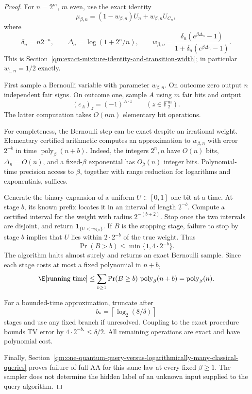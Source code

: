 \begin{proof}
For \(n=2^m\), \(m\) even, use the exact identity
\[
 \mu_{\beta,n}=(1-w_{\beta,n})U_n+w_{\beta,n}U_{C_n},
\]
where
\[
 \delta_n=n2^{-n},\qquad
 \Delta_n=\log(1+2^n/n),\qquad
 w_{\beta,n}
 =\frac{\delta_n(e^{\beta\Delta_n}-1)}
        {1+\delta_n(e^{\beta\Delta_n}-1)}.
\]
This is Section~\ref{qm:exact-mixture-identity-and-transition-width};
in particular \(w_{1,n}=1/2\) exactly.

First sample a Bernoulli variable with parameter \(w_{\beta,n}\).
On outcome zero output \(n\) independent fair signs. On outcome one,
sample \(A\) using \(m\) fair bits and output
\[
 (c_A)_z=(-1)^{A\cdot z}\qquad(z\in\mathbb F_2^m).
\]
The latter computation takes \(O(nm)\) elementary bit operations.

For completeness, the Bernoulli step can be exact despite an
irrational weight. Elementary certified arithmetic computes an
approximation to \(w_{\beta,n}\) with error \(2^{-b}\) in time
\(\operatorname{poly}_\beta(n+b)\). Indeed, the integers \(2^n,n\)
have \(O(n)\) bits, \(\Delta_n=O(n)\), and a fixed-\(\beta\)
exponential has \(O_\beta(n)\) integer bits. Polynomial-time
precision access to \(\beta\), together with range reduction for
logarithms and exponentials, suffices.

Generate the binary expansion of a uniform \(U\in[0,1]\) one bit at
a time. At stage \(b\), its known prefix locates it in an interval
of length \(2^{-b}\). Compute a certified interval for the weight
with radius \(2^{-(b+2)}\). Stop once the two intervals are disjoint,
and return \(\mathbf1_{\{U<w_{\beta,n}\}}\).
If \(B\) is the stopping stage, failure to stop by stage \(b\)
implies that \(U\) lies within \(2\cdot2^{-b}\) of the true weight.
Thus
\[
 \Pr(B>b)\le\min\{1,4\cdot2^{-b}\}.
\]
The algorithm halts almost surely and returns an exact Bernoulli
sample. Since each stage costs at most a fixed polynomial in \(n+b\),
\[
 \E[\text{running time}]
 \le\sum_{b\ge1}\Pr(B\ge b)\,
       \operatorname{poly}_\beta(n+b)
 =\operatorname{poly}_\beta(n).
\]

For a bounded-time approximation, truncate after
\[
 b_*=\left\lceil\log_2(8/\delta)\right\rceil
\]
stages and use any fixed branch if unresolved. Coupling to the exact
procedure bounds TV error by
\(4\cdot2^{-b_*}\le\delta/2\).
All remaining operations are exact and have polynomial cost.

Finally,
Section~\ref{qm:one-quantum-query-versus-logarithmically-many-classical-queries}
proves failure of full AA for this same law at every fixed
\(\beta\ge1\). The sampler does not determine the hidden label of an
unknown input supplied to the query algorithm.
\end{proof}

